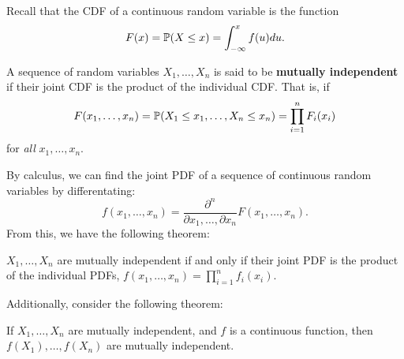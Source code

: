 \documentclass[letterpaper]{article}
\begin{document}
Recall that the CDF of a continuous random variable is the function 
\[F(x) = \mathbb{P}(X \leq x) = \int_{-\infty}^{x} f(u) du.\]

\begin{definition}{}{}
    A sequence of random variables $X_1, \dots, X_n$ is said to be \textbf{mutually independent} if their joint CDF is the product of the individual CDF. That is, if 
    \[F(x_1, \dots, x_n) = \mathbb{P}(X_1 \leq x_1, \dots, X_n \leq x_n) = \prod_{i = 1}^{n} F_{i}(x_i)\]
    for \emph{all} $x_1, \dots, x_n$. 
\end{definition}
By calculus, we can find the joint PDF of a sequence of continuous random variables by differentating: 
\[f(x_1, \dots, x_n) = \frac{\partial^n}{\partial x_1, \dots, \partial x_n} F(x_1, \dots, x_n).\]
From this, we have the following theorem: 
\begin{theorem}{}{}
    $X_1, \dots, X_n$ are mutually independent if and only if their joint PDF is the product of the individual PDFs, $f(x_1, \dots, x_n) = \prod_{i = 1}^{n} f_{i}(x_i)$. 
\end{theorem}
Additionally, consider the following theorem: 
\begin{theorem}{}{}
    If $X_1, \dots, X_n$ are mutually independent, and $f$ is a continuous function, then $f(X_1), \dots, f(X_n)$ are mutually independent.
\end{theorem}
\end{document}
